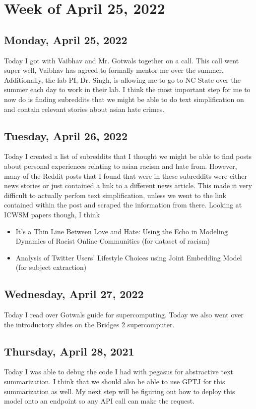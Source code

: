 \documentclass[11pt,letterpaper]{article}
\begin{document}
\section{Week of April 25, 2022}
\subsection{Monday, April 25, 2022}
Today I got with Vaibhav and Mr. Gotwals together on a call. This call went super well, Vaibhav has agreed to formally mentor me over the summer. Additionally, the lab PI, Dr. Singh, is allowing me to go to NC State over the summer each day to work in their lab. I think the most important step for me to now do is finding subreddits that we might be able to do text simplification on and contain relevant stories about asian hate crimes.

\subsection{Tuesday, April 26, 2022}
Today I created a list of subreddits that I thought we might be able to find posts about personal experiences relating to asian racism and hate from. However, many of the Reddit posts that I found that were in these subreddits were either news stories or just contained a link to a different news article. This made it very difficult to actually perfom text simplification, unless we went to the link contained within the post and scraped the information from there. Looking at ICWSM papers though, I think 

\begin{itemize}
    \item It's a Thin Line Between Love and Hate: Using the Echo in Modeling Dynamics of Racist Online Communities (for dataset of racism)
    \item Analysis of Twitter Users' Lifestyle Choices using Joint Embedding Model (for subject extraction)
\end{itemize}

\subsection{Wednesday, April 27, 2022}
Today I read over Gotwals guide for supercomputing. Today we also went over the introductory slides on the Bridges 2 supercomputer.

\subsection{Thursday, April 28, 2021}
Today I was able to debug the code I had with pegasus for abstractive text summarization. I think that we should also be able to use GPTJ for this summarization as well. My next step will be figuring out how to deploy this model onto an endpoint so any API call can make the request.
\end{document}
